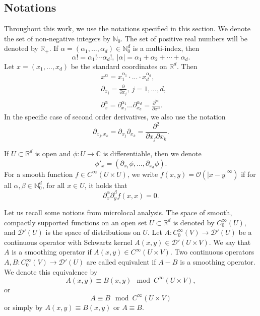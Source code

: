 \documentclass{article}
\newcommand{\CC}{\mathbb C}
\newcommand{\RR}{\mathbb R}
\newcommand{\NN}{\mathbb N}
\newcommand{\mcd}{\mathcal D}
\newcommand{\mco}{\mathcal O}
\begin{document}
\subsection{Notations}\label{notations}
%
Throughout this work, we use the notations specified in this section. We denote the set of non-negative integers by $\NN_0$. The set of positive real numbers will be denoted by $\RR_+$. If $\alpha = (\alpha_1, ..., \alpha_d)\in \NN_0^d$ is a multi-index, then
\begin{equation*}  \alpha! = \alpha_1! \cdots\alpha_d!,\ |\alpha| = \alpha_1 + \alpha_2 +\cdots+ \alpha_d.\end{equation*}
Let $x = (x_1, ..., x_d)$ be the standard coordinates on $\RR^d$. Then
\begin{equation*} \begin{aligned} &x^\alpha = x_1^{\alpha_1} \cdot ... \cdot x_d^{\alpha_d},\\
& \partial_{x_j} = \frac{\partial}{\partial x_j},\ j =1,...,d,\\ &\partial_x^\alpha = \partial^{\alpha_1}_{x_1} ... \partial^{\alpha_d}_{x_d} = \frac{\partial^{|\alpha|}}{\partial x^\alpha}.\end{aligned} \end{equation*}
%
In the specific case of second order derivatives, we also use the notation $$\partial_{x_j, x_k} = \partial_{x_j} \partial_{x_k} = \frac{\partial^2}{\partial x_j \partial x_k}.$$

%
If $U \subset \RR^d$ is open and $\phi : U \to \CC$ is differentiable, then we denote $$\phi'_x = (\partial_{x_1} \phi, ..., \partial_{x_d} \phi).$$%
For a smooth function $f \in C^\infty(U \times U)$, we write $f(x,y) = \mco(|x-y|^\infty)$ if for all $\alpha, \beta \in \NN_0^d$, for all $x \in U$, it holds that $$\partial^\alpha_x \partial^\beta_y f(x,x) = 0.$$

Let us recall some notions from microlocal analysis.
The space of smooth, compactly supported functions on an open set $U \subset \RR^d$ is denoted by $C^\infty_0(U)$, and $\mcd'(U)$ is the space of distributions on $U$.
Let $A : C_0^\infty(V) \to \mcd'(U)$ be a continuous operator with Schwartz kernel $A(x,y) \in \mcd'(U \times V)$. We say that $A$ is a smoothing operator if $A(x,y) \in C^\infty(U \times V)$. Two continuous operators $A,B : C^\infty_0(V) \to \mcd'(U)$ are called equivalent if $A-B$ is a smoothing operator. We denote this equivalence by $$A(x,y) \equiv B(x,y) \mod C^\infty(U \times V),$$ or 
\[A\equiv B \mod C^\infty(U\times V)\]
or simply by $A(x,y) \equiv B(x,y)$ or $A\equiv B$.
\end{document}
